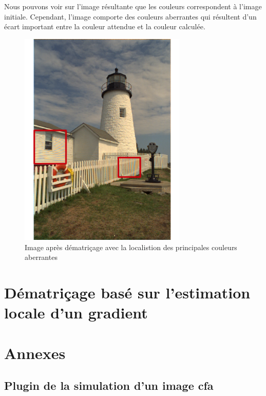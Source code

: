 \documentclass[a4paper,11pt]{article}
\begin{document}
   Nous pouvons voir sur l'image résultante que les couleurs correspondent à l'image initiale. Cependant,
   l'image comporte des couleurs aberrantes qui résultent d'un écart important entre la couleur attendue
   et la couleur calculée.

  \begin{figure}[H]
  \center
   \includegraphics[width=8cm]{../result2ROI.png}
   \caption{Image après dématriçage avec la localistion des principales couleurs aberrantes}
  \end{figure}
   
  \section{Dématriçage basé sur l'estimation locale d'un gradient}
  
  \newpage
 
  \section{Annexes}
  
  \subsection{Plugin de la simulation d'un image cfa}
  
\end{document}
